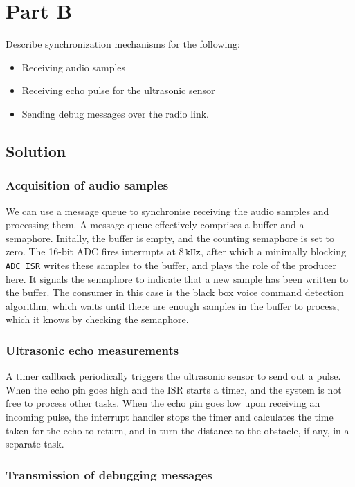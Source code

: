 \section*{Part B}

Describe synchronization mechanisms for the following:
\begin{itemize}[noitemsep, topsep=0pt]
    \item Receiving audio samples
    \item Receiving echo pulse for the ultrasonic sensor
    \item Sending debug messages over the radio link.
\end{itemize}

\subsection*{Solution}

\subsubsection*{Acquisition of audio samples}

We can use a message queue to synchronise receiving the audio samples and processing them.
A message queue effectively comprises a buffer and a semaphore.
Initally, the buffer is empty, and the counting semaphore is set to zero.
The 16-bit ADC fires interrupts at \( 8\,\texttt{kHz} \), after which a minimally blocking \texttt{ADC ISR} writes these samples to the buffer, and plays the role of the producer here.
It signals the semaphore to indicate that a new sample has been written to the buffer.
The consumer in this case is the black box voice command detection algorithm, which waits until there are enough samples in the buffer to process, which it knows by checking the semaphore.

\subsubsection*{Ultrasonic echo measurements}

A timer callback periodically triggers the ultrasonic sensor to send out a pulse.
When the echo pin goes high and the ISR starts a timer, and the system is not free to process other tasks.
When the echo pin goes low upon receiving an incoming pulse, the interrupt handler stops the timer and calculates the time taken for the echo to return, and in turn the distance to the obstacle, if any, in a separate task.

\subsubsection*{Transmission of debugging messages}
